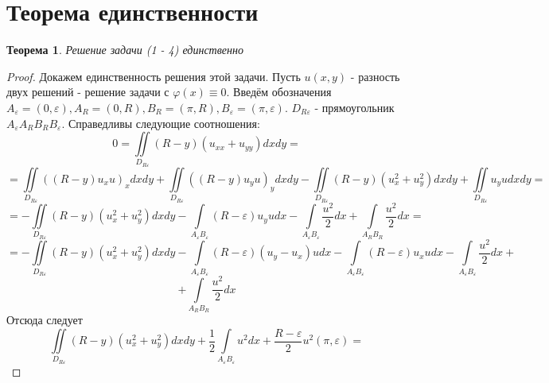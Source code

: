 \documentclass[a4paper, 11pt]{article}
\newtheorem{theorem}{Теорема}
\begin{document}
\section{Теорема единственности}
\begin{theorem}
	Решение задачи (1 - 4) единственно
\end{theorem}
\begin{proof}
	Докажем единственность решения этой задачи. Пусть $u(x,y)$ - разность двух решений - решение задачи с $\varphi(x) \equiv 0$.
	Введём обозначения $A_\varepsilon = (0, \varepsilon), A_R = (0, R), B_R = (\pi, R), B_\varepsilon = (\pi, \varepsilon)$. $D_{R\varepsilon}$ - прямоугольник $A_\varepsilon A_R B_R B_\varepsilon$. Справедливы следующие соотношения:
	\begin{equation*}
		0 = \iint\limits_{D_{R\varepsilon}} (R-y) (u_{xx} + u_{yy}) dx dy = 
	\end{equation*}
	\begin{equation*}
		=	\iint\limits_{D_{R\varepsilon}} \left( \left(R - y\right) u_x u\right)_x dx dy  + \iint\limits_{D_{R\varepsilon}} \left( \left(R - y\right) u_y u\right)_y dx dy  
		- \iint\limits_{D_{R\varepsilon}} \left(R- y\right) \left(u_x^2 + u_y^2\right)dxdy + \iint\limits_{D_{R\varepsilon}} u_y u dx dy = 
	\end{equation*}
	\begin{equation*}
		= - \iint\limits_{D_{R\varepsilon}} \left(R - y\right) \left(u_x^2 + u_y^2\right) dx dy
		- \int\limits_{A_\varepsilon B_\varepsilon} \left(R - \varepsilon\right) u_y u dx 
		-\int\limits_{A_\varepsilon B_\varepsilon} \dfrac{u^2}{2} dx + \int\limits_{A_R B_R} \dfrac{u^2}{2} dx = 
	\end{equation*}
	\begin{equation*}
		= - \iint\limits_{D_{R\varepsilon}} \left(R - y\right) \left(u_x^2 + u_y^2\right) dx dy - 
		\int\limits_{A_\varepsilon B_\varepsilon} \left(R - \varepsilon \right) \left(u_y - u_x\right)u dx - \int\limits_{A_\varepsilon B_\varepsilon} \left(R - \varepsilon\right) u_x u dx - \int\limits_{A_\varepsilon B_\varepsilon}\dfrac{u^2}{2} dx +
	\end{equation*}
	\begin{equation*}
		+ \int\limits_{A_R B_R} \dfrac{u^2}{2}dx
	\end{equation*}
	Отсюда следует
	\begin{equation*}
		\iint\limits_{D_{R\varepsilon}} \left(R - y\right) \left(u_x^2 + u_y^2\right) dx dy + \dfrac{1}{2}\int\limits_{A_\varepsilon B_\varepsilon} u^2 dx +\dfrac{R - \varepsilon}{2}u^2(\pi, \varepsilon)  =

\end{equation*}
\end{proof}
\end{document}
